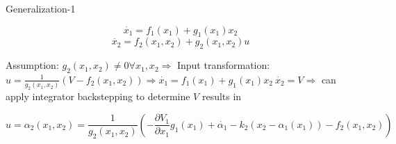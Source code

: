 Generalization-1

\begin{equation*}
\dot{x_1} = f_1(x_1) + g_1(x_1)x_2
\end{equation*}
\begin{equation*}
\dot{x_2} = f_2(x_1, x_2) + g_2(x_1,x_2)u
\end{equation*}

Assumption: $g_2(x_1, x_2) \neq 0 \forall x_1, x_2 \Rightarrow $ Input transformation: $u = \frac{1}{g_2(x_1, x_2)}(V - f_2(x_1, x_2)) \Rightarrow \dot{x_1} = f_1(x_1) + g_1(x_1)x_2 \ \dot{x_2} = V \Rightarrow $ can apply integrator backstepping to determine $V$ results in 

\begin{equation*}
u = \alpha_2(x_1, x_2) = \frac{1}{g_2(x_1,x_2)}(-\frac{\partial V_1}{\partial x_1}g_1(x_1) + \dot{\alpha_1} - k_2(x_2 - \alpha_1(x_1)) - f_2(x_1, x_2))
\end{equation*} 
